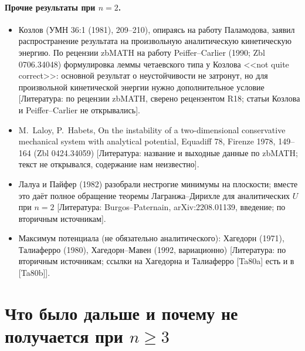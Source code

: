 \documentclass[11pt,a4paper]{article}
\theoremstyle{definition}
\newcommand{\mk}[1]{\textsf{[#1]}}
\begin{document}
\paragraph{Прочие результаты при $n=2$.}
\begin{itemize}[leftmargin=*]
\item Козлов (УМН 36:1 (1981), 209--210), опираясь на работу Паламодова, заявил распространение
результата на произвольную аналитическую кинетическую энергию. По рецензии zbMATH на работу
Peiffer--Carlier (1990; Zbl 0706.34048) формулировка леммы четаевского типа у Козлова <<not quite
correct>>: основной результат о неустойчивости не затронут, но для произвольной кинетической энергии
нужно дополнительное условие \mk{Литература: по рецензии zbMATH, сверено рецензентом R18; статьи
Козлова и Peiffer--Carlier не открывались}.
\item M.~Laloy, P.~Habets, On the instability of a two-dimensional conservative mechanical system
with analytical potential, Equadiff 78, Firenze 1978, 149--164 (Zbl 0424.34059) \mk{Литература:
название и выходные данные по zbMATH; текст не открывался, содержание нам неизвестно}.
\item Лалуа и Пайфер (1982) разобрали нестрогие минимумы на плоскости; вместе это даёт полное
обращение теоремы Лагранжа--Дирихле для аналитических $U$ при $n=2$ \mk{Литература:
Burgos--Paternain, arXiv:2208.01139, введение; по вторичным источникам}.
\item Максимум потенциала (не обязательно аналитического): Хагедорн (1971), Талиаферро (1980),
Хагедорн--Мавен (1992, вариационно) \mk{Литература: по вторичным источникам; ссылки на Хагедорна и
Талиаферро [Ta80a] есть и в [Ta80b]}.
\end{itemize}

\section{Что было дальше и почему не получается при $n\ge3$}\label{sec:after}
\end{document}
